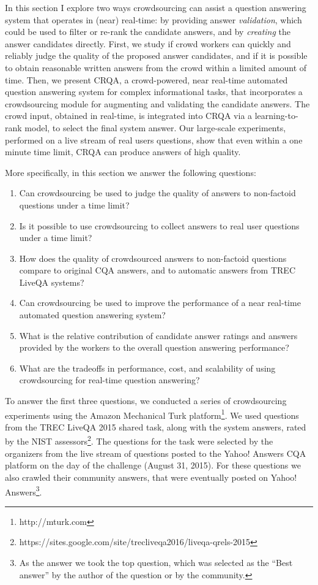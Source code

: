 In this section I explore two ways crowdsourcing can assist a question answering system that operates in (near) real-time: by providing answer {\em validation}, which could be used to filter or re-rank the candidate answers, and by {\em creating} the answer candidates directly.
First, we study if crowd workers can quickly and reliably judge the quality of the proposed answer candidates, and if it is possible to obtain reasonable written answers from the crowd within a limited amount of time.
Then, we present CRQA, a crowd-powered, near real-time automated question answering system for complex informational tasks, that incorporates a crowdsourcing module for augmenting and validating the candidate answers.
The crowd input, obtained in real-time, is integrated into CRQA via a learning-to-rank model, to select the final system answer.
Our large-scale experiments, performed on a live stream of real users questions, show that even within a one minute time limit, CRQA can produce answers of high quality.

More specifically, in this section we answer the following questions:
\begin{enumerate}
\item Can crowdsourcing be used to judge the quality of answers to non-factoid questions under a time limit?
\item Is it possible to use crowdsourcing to collect answers to real user questions under a time limit?
\item How does the quality of crowdsourced answers to non-factoid questions compare to original CQA answers, and to automatic answers from TREC LiveQA systems?
\item Can crowdsourcing be used to improve the performance of a near real-time automated question answering system?
\item What is the relative contribution of candidate answer ratings and answers provided by the workers to the overall question answering performance?
\item What are the tradeoffs in performance, cost, and scalability of using crowdsourcing for real-time question answering?
\end{enumerate}

To answer the first three questions, we conducted a series of crowdsourcing experiments using the Amazon Mechanical Turk platform\footnote{http://mturk.com}.
We used questions from the TREC LiveQA 2015 shared task, along with the system answers, rated by the NIST assessors\footnote{https://sites.google.com/site/trecliveqa2016/liveqa-qrels-2015}.
The questions for the task were selected by the organizers from the live stream of questions posted to the Yahoo! Answers CQA platform on the day of the challenge (August 31, 2015).
For these questions we also crawled their community answers, that were eventually posted on Yahoo! Answers\footnote{As the answer we took the top question, which was selected as the ``Best answer'' by the author of the question or by the community.}.


